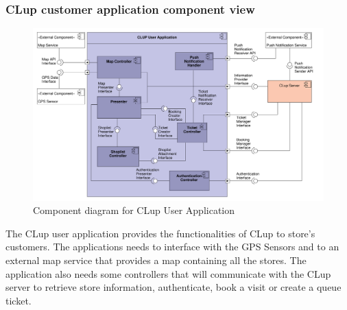 \subsubsection{CLup customer application component view}
\begin{figure}[H]
    \includegraphics[width=\textwidth]{Images/UML_user_app_component.pdf}
    \caption{\label{fig:UML_comp_CLup_user_app}Component diagram for CLup User Application}
\end{figure}

The CLup user application provides the functionalities of CLup to store's customers. The applications needs to interface with the GPS Sensors and to an external map service that provides a map containing all the stores. The application also needs some controllers that will communicate with the CLup server to retrieve store information, authenticate, book a visit or create a queue ticket.

